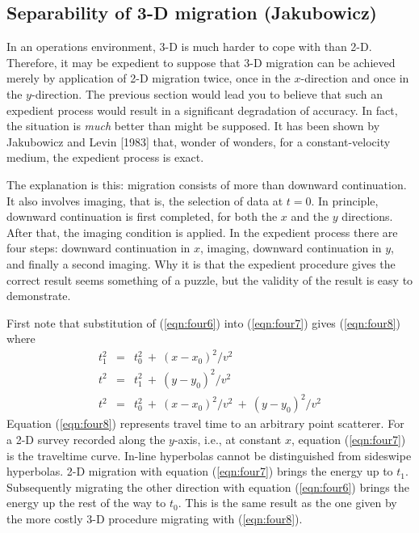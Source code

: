 {\subsection{Separability of 3-D migration (Jakubowicz)}
\par
In an operations environment, 3-D is much harder to cope with than 2-D.
Therefore, it may be expedient to suppose that 3-D migration
can be achieved merely by application of 2-D migration twice, once
in the $x$-direction and once in the $y$-direction.
The previous section would lead you to believe that such an expedient process
would result in a significant degradation of accuracy.
In fact, the situation is
{\em  much}
better than might be supposed.
It has been shown by Jakubowicz and Levin [1983]
that, wonder of wonders, for a constant-velocity medium,
the expedient process is exact.
\par
The explanation is this:
migration consists of more than downward continuation.
It also involves imaging, that is, the selection of data at  $t=0$.
In principle, downward continuation is first completed,
for both the  $x$  and the  $y$  directions.
After that, the imaging condition is applied.
In the expedient process there are four steps:
downward continuation in  $x$, imaging,
downward continuation in  $y$, and finally
a second imaging.
Why it is that the expedient procedure gives the correct result
seems something of a puzzle, but the validity of the result
is easy to demonstrate.
\par
First note that substitution of (\ref{eqn:four6}) into (\ref{eqn:four7})
gives (\ref{eqn:four8}) where
\begin{eqnarray}
t_1^2 &=& t_0^2 \ +\  (x - x_0 )^2 / v^2
\label{eqn:four6}
\\
t^2 &=& t_1^2 \ +\  (y - y_0 )^2 / v^2
\label{eqn:four7}
\\
t^2 &=& t_0^2
\ +\  (x - x_0 )^2 / v^2
\ +\  (y - y_0 )^2 / v^2
\label{eqn:four8}
\end{eqnarray}
Equation (\ref{eqn:four8}) represents travel time
to an arbitrary point scatterer.
For a 2-D survey recorded along the $y$-axis,
i.e.,
at constant $x$, equation (\ref{eqn:four7}) is the traveltime curve.
In-line hyperbolas cannot be distinguished from sideswipe hyperbolas.
2-D migration with equation (\ref{eqn:four7}) brings the energy up to $t_1$.
Subsequently migrating the other direction with equation (\ref{eqn:four6})
brings the energy up the rest of the way to  $t_0$.
This is the same result as the one
given by the more costly 3-D procedure migrating with (\ref{eqn:four8}).
}
